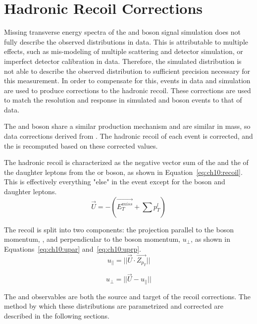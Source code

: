 \chapter{Hadronic Recoil Corrections}\label{ch:recoil}

Missing transverse energy spectra of the \W and \Z boson signal simulation does not fully describe the observed distributions in data. This is attributable to multiple effects, such as mis-modeling of multiple scattering and detector simulation, or imperfect detector calibration in data. Therefore, the simulated \met distribution is not able to describe the observed \met distribution to sufficient precision necessary for this measurement. In order to compensate for this, \zmm events in data and simulation are used to produce corrections to the hadronic recoil. These corrections are used to match the \met resolution and response in simulated \W and \Z boson events to that of data.

The \W and \Z boson share a similar production mechanism and are similar in mass, so data corrections derived from \zmm. The hadronic recoil of each event is corrected, and the \met is recomputed based on these corrected values. 

The hadronic recoil is characterized as the negative vector sum of the \met and the \pt of the daughter leptons from the \W or \Z boson, as shown in Equation~\ref{eq:ch10:recoil}. This is effectively everything "else" in the event except for the \W boson and daughter leptons.
\begin{equation}
\vec{U}=-(\vec{E_T^{miss}}+\sum{p_{T}^l})
    \label{eq:ch10:recoil}
\end{equation}

The recoil is split into two components: the projection parallel to the boson momentum, \upar, and perpendicular to the boson momentum, $u_\perp$, as shown in Equations~\ref{eq:ch10:upar} and~\ref{eq:ch10:uprp}. 
\begin{equation}
    u_{||} = ||\vec{U}\cdot \vec{Z_{p_T}}||
    \label{eq:ch10:upar}
\end{equation}

\begin{equation}
    u_\perp = ||\vec{U} -  u_{||}||
    \label{eq:ch10:uprp}
\end{equation}


The \upar and \uprp observables are both the source and target of the recoil corrections. The method by which these distributions are parametrized and corrected are described in the following sections.

